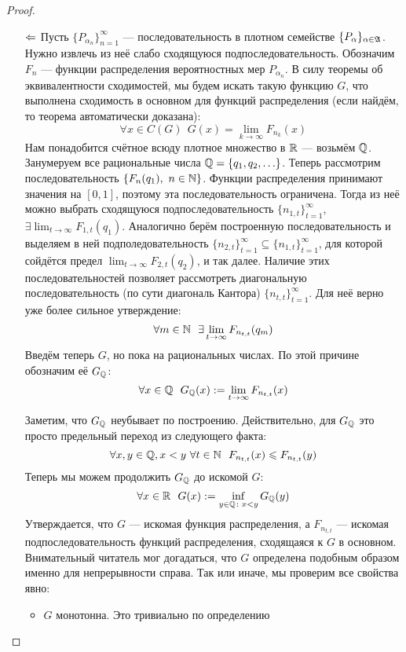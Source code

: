 \begin{proof}
\begin{itemize}
        \item[$\Leftarrow$] Пусть $\{P_{\alpha_n}\}_{n = 1}^\infty$ --- последовательность в плотном семействе $\{P_\alpha\}_{\alpha \in \mathfrak{A}}$. Нужно извлечь из неё слабо сходящуюся подпоследовательность. Обозначим $F_n$ --- функции распределения вероятностных мер $P_{\alpha_n}$. В силу теоремы об эквивалентности сходимостей, мы будем искать такую функцию $G$, что выполнена сходимость в основном для функций распределения (если найдём, то теорема автоматически доказана):
        \[
            \forall x \in C(G)\ \ G(x) = \lim_{k \to \infty} F_{n_k}(x)
        \]
        Нам понадобится счётное всюду плотное множество в $\mathbb{R}$ --- возьмём $\mathbb{Q}$. Занумеруем все рациональные числа $\mathbb{Q} = \{q_1, q_2, \ldots\}$. Теперь рассмотрим последовательность $\{F_n(q_1),\ n \in \mathbb{N}\}$. Функции распределения принимают значения на $[0, 1]$, поэтому эта последовательность ограничена. Тогда из неё можно выбрать сходящуюся подпоследовательность $\{n_{1, t}\}_{t = 1}^\infty$, $\exists \lim_{t \to \infty} F_{1, t}(q_1)$. Аналогично берём построенную последовательность и выделяем в ней подполедовательность $\{n_{2, t}\}_{t = 1}^\infty \subseteq \{n_{1, t}\}_{t = 1}^\infty$, для которой сойдётся предел $\lim_{t \to \infty} F_{2, t}(q_2)$, и так далее. Наличие этих последовательностей позволяет рассмотреть диагональную последовательность (по сути диагональ Кантора) $\{n_{t, t}\}_{t = 1}^\infty$. Для неё верно уже более сильное утверждение:
        \[
        	\forall m \in \mathbb{N}\ \ \exists \lim_{t \to \infty} F_{n_{t, t}}(q_m)
        \]
        Введём теперь $G$, но пока на рациональных числах. По этой причине обозначим её $G_{\mathbb{Q}}$:
        \[
            \forall x \in \mathbb{Q}\ \ G_{\mathbb{Q}}(x) := \lim_{t \to \infty} F_{n_{t, t}}(x)
        \]

        Заметим, что $G_{\mathbb{Q}}$ неубывает по построению. Действительно, для $G_{\mathbb{Q}}$ это просто предельный переход из следующего факта:
        \[
        	\forall x, y \in \Q, x < y\ \forall t \in \N\ \ F_{n_{t, t}}(x) \le F_{n_{t, t}}(y)
        \]
		Теперь мы можем продолжить $G_{\mathbb{Q}}$ до искомой $G$:
        \[
            \forall x \in \mathbb{R}\ \ G(x) := \inf_{y \in \mathbb{Q} \colon x < y} G_{\mathbb{Q}}(y)
        \]
        Утверждается, что $G$ --- искомая функция распределения, а $F_{n_{t, t}}$ --- искомая подпоследовательность функций распределения, сходящаяся к $G$ в основном. Внимательный читатель мог догадаться, что $G$ определена подобным образом именно для непрерывности справа. Так или иначе, мы проверим все свойства явно:
        \begin{itemize}
        	\item $G$ монотонна. Это тривиально по определению
        	

\end{itemize}
\end{itemize}
\end{proof}
